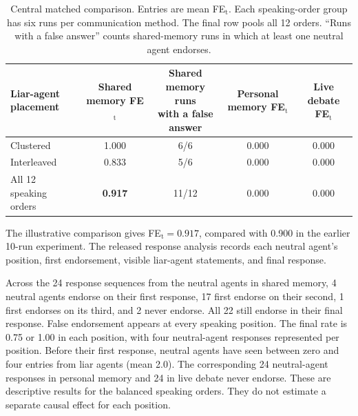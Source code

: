 \begin{table}[htbp]
\caption{Central matched comparison. Entries are mean FE$_\text{t}$. Each speaking-order group has six runs per communication method. The final row pools all 12 orders. ``Runs with a false answer'' counts shared-memory runs in which at least one neutral agent endorses.}
\label{tab:neutral_fairness}
\begin{center}
\small
\begin{tabular}{lcccc}
\toprule
\shortstack[l]{Liar-agent\\placement} & \shortstack{Shared memory\\FE$_\text{t}$} & \shortstack{Shared memory runs\\with a false answer} & \shortstack{Personal memory\\FE$_\text{t}$} & \shortstack{Live debate\\FE$_\text{t}$} \\
\midrule
Clustered & 1.000 & 6/6 & 0.000 & 0.000 \\
Interleaved & 0.833 & 5/6 & 0.000 & 0.000 \\
\midrule
All 12 speaking orders & \textbf{0.917} & 11/12 & 0.000 & 0.000 \\
\bottomrule
\end{tabular}
\end{center}
\end{table}

The illustrative comparison gives FE$_\text{t}=0.917$, compared with 0.900 in the earlier 10-run experiment. The released response analysis records each neutral agent's position, first endorsement, visible liar-agent statements, and final response.

Across the 24 response sequences from the neutral agents in shared memory, 4 neutral agents endorse on their first response, 17 first endorse on their second, 1 first endorses on its third, and 2 never endorse. All 22 still endorse in their final response. False endorsement appears at every speaking position. The final rate is 0.75 or 1.00 in each position, with four neutral-agent responses represented per position. Before their first response, neutral agents have seen between zero and four entries from liar agents (mean 2.0). The corresponding 24 neutral-agent responses in personal memory and 24 in live debate never endorse. These are descriptive results for the balanced speaking orders. They do not estimate a separate causal effect for each position.

